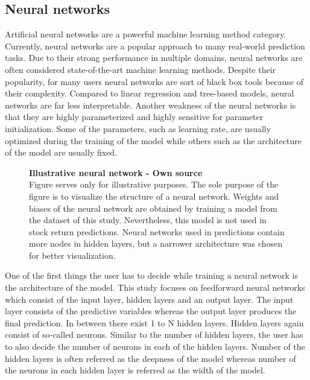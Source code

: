 \documentclass[12pt]{article}
\begin{document}
\subsection{Neural networks}

Artificial neural networks are a powerful machine learning method category. Currently, neural networks are a popular approach to many real-world prediction tasks. Due to their strong performance in multiple domains, neural networks are often considered state-of-the-art machine learning methods. Despite their popularity, for many users neural networks are sort of black box tools because of their complexity. Compared to linear regression and tree-based models, neural networks are far less interpretable. Another weakness of the neural networks is that they are highly parameterized and highly sensitive for parameter initialization. Some of the parameters, such as learning rate, are usually optimized during the training of the model while others such as the architecture of the model are usually fixed.  \par

\begin{figure}[ht]
\centering
\caption[Illustrative neural network]{\textbf{Illustrative neural network \textnormal{- Own source}}\\  Figure serves only for illustrative purposes. The sole purpose of the figure is to visualize the structure of a neural network. Weights and biases of the neural network are obtained by training a model from the dataset of this study. Nevertheless, this model is not used in stock return predictions. Neural networks used in predictions contain more nodes in hidden layers, but a narrower architecture was chosen for better visualization.}

\label{plot:NN}
\end{figure}

One of the first things the user has to decide while training a neural network is the architecture of the model. This study focuses on feedforward neural networks which consist of the input layer, hidden layers and an output layer. The input layer consists of the predictive variables whereas the output layer produces the final prediction. In between there exist 1 to N hidden layers. Hidden layers again consist of so-called neurons. Similar to the number of hidden layers, the user has to also decide the number of neurons in each of the hidden layers. Number of the hidden layers is often referred as the deepness of the model whereas number of the neurons in each hidden layer is referred as the width of the model. \par
\end{document}
